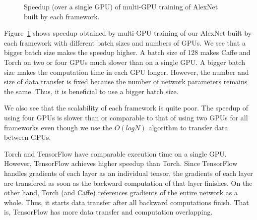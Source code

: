 \begin{figure}[htbp]
  \centering
\caption{Speedup (over a single GPU) of multi-GPU training of AlexNet built by each framework.}
\label{fig_mg}
\end{figure}

Figure~\ref{fig_mg} shows speedup obtained by multi-GPU training of our AlexNet built by each framework with different batch sizes and numbers of GPUs. We see that a bigger batch size makes the speedup higher. A batch size of 128 makes Caffe and Torch on two or four GPUs much slower than on a single GPU. A bigger batch size makes the computation time in each GPU longer. However, the number and size of data transfer is fixed because the number of network parameters remains the same. Thus, it is beneficial to use a bigger batch size.

We also see that the scalability of each framework is quite poor. The speedup of using four GPUs is slower than or comparable to that of using two GPUs for all frameworks even though we use the $O(log N)$ algorithm to transfer data between GPUs. 

Torch and TensorFlow have comparable execution time on a single GPU. However, TensorFlow achieves higher speedup than Torch. Since TensorFlow handles gradients of each layer as an individual tensor, the gradients of each layer are transfered as soon as the backward computation of that layer finishes. On the other hand, Torch (and Caffe) references gradients of the entire network as a whole. Thus, it starts data transfer after all backward computations finish. That is, TensorFlow has more data transfer and computation overlapping.

